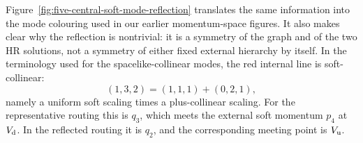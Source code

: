 \documentclass[a4paper,11pt]{article}
\begin{document}
Figure~\ref{fig:five-central-soft-mode-reflection} translates the same
information into the mode colouring used in our earlier momentum-space
figures.  It also makes clear why the reflection is nontrivial: it is a
symmetry of the graph and of the two HR solutions, not a symmetry of either
fixed external hierarchy by itself.  In the terminology used for the
spacelike-collinear modes, the red internal line is soft-collinear:
\begin{equation}
 (1,3,2)=(1,1,1)+(0,2,1),
 \label{eq:five-central-soft-soft-collinear-sum}
\end{equation}
namely a uniform soft scaling times a plus-collinear scaling.
For the representative routing this is \(q_3\), which meets the external
soft momentum \(p_4\) at \(V_{\rm d}\).  In the reflected routing it is
\(q_2\), and the corresponding meeting point is \(V_{\rm u}\).
\end{document}
